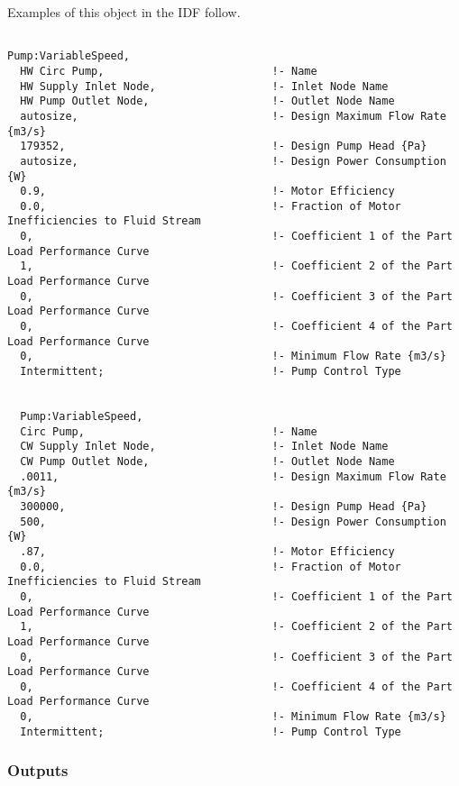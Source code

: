 Examples of this object in the IDF follow.

\begin{lstlisting}

Pump:VariableSpeed,
  HW Circ Pump,                          !- Name
  HW Supply Inlet Node,                  !- Inlet Node Name
  HW Pump Outlet Node,                   !- Outlet Node Name
  autosize,                              !- Design Maximum Flow Rate {m3/s}
  179352,                                !- Design Pump Head {Pa}
  autosize,                              !- Design Power Consumption {W}
  0.9,                                   !- Motor Efficiency
  0.0,                                   !- Fraction of Motor Inefficiencies to Fluid Stream
  0,                                     !- Coefficient 1 of the Part Load Performance Curve
  1,                                     !- Coefficient 2 of the Part Load Performance Curve
  0,                                     !- Coefficient 3 of the Part Load Performance Curve
  0,                                     !- Coefficient 4 of the Part Load Performance Curve
  0,                                     !- Minimum Flow Rate {m3/s}
  Intermittent;                          !- Pump Control Type


  Pump:VariableSpeed,
  Circ Pump,                             !- Name
  CW Supply Inlet Node,                  !- Inlet Node Name
  CW Pump Outlet Node,                   !- Outlet Node Name
  .0011,                                 !- Design Maximum Flow Rate {m3/s}
  300000,                                !- Design Pump Head {Pa}
  500,                                   !- Design Power Consumption {W}
  .87,                                   !- Motor Efficiency
  0.0,                                   !- Fraction of Motor Inefficiencies to Fluid Stream
  0,                                     !- Coefficient 1 of the Part Load Performance Curve
  1,                                     !- Coefficient 2 of the Part Load Performance Curve
  0,                                     !- Coefficient 3 of the Part Load Performance Curve
  0,                                     !- Coefficient 4 of the Part Load Performance Curve
  0,                                     !- Minimum Flow Rate {m3/s}
  Intermittent;                          !- Pump Control Type
\end{lstlisting}

\subsubsection{Outputs}\label{outputs-026}

